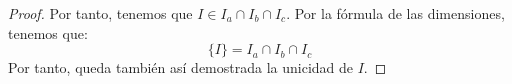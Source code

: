 \begin{proof}
    Por tanto, tenemos que $I\in I_a\cap I_b\cap I_c$. Por la fórmula de las dimensiones, tenemos que:
    \begin{equation*}
        \{I\} = I_a\cap I_b \cap I_c
    \end{equation*}
    Por tanto, queda también así demostrada la unicidad de $I$.

    \begin{comment}
    Para ello, veremos que $\vec{cI}\in \cc{L}\left\{\frac{\vec{ca}}{\left\|\vec{ca}\right\|} + \frac{\vec{cb}}{\left\|\vec{cb}\right\|}\right\}$.
    Por la igualdad triangular y como $I\in I_a$, entonces $\exists \lm_a\in \bb{R}$ tal que:
    \begin{align*}
        \vec{cI} &= \vec{ca} + \vec{aI}
                 = \vec{ca} + \lm_a \frac{\vec{ab}}{\left\|\vec{ab}\right\|} + \lm_a \frac{\vec{ac}}{\left\|\vec{ac}\right\|}
                 = \left(1-\frac{\lm_a}{\left\|\vec{ac}\right\|}\right)\vec{ca} + \frac{\lm_a}{\left\|\vec{ab}\right\|}\vec{ab} \AstIg \\
                 &\AstIg \left(1-\frac{\lm_a}{\left\|\vec{ac}\right\|}-\frac{\lm_a}{\left\|\vec{ab}\right\|}\right)\vec{ca} + \frac{\lm_a}{\left\|\vec{ab}\right\|}\vec{cb}=
    \end{align*}
    donde en $(\ast)$ he empleado que $\vec{ab}=-\vec{ca} + \vec{cb}$. Análogamente, como $I\in I_b$, entonces $\exists \lm_b\in \bb{R}$ tal que:
    \begin{align*}
        \vec{cI} &= \vec{cb} + \vec{bI}
                 = \vec{cb} + \lm_b \frac{\vec{ba}}{\left\|\vec{ba}\right\|} + \lm_b \frac{\vec{bc}}{\left\|\vec{bc}\right\|}
                 = \left(1-\frac{\lm_b}{\left\|\vec{bc}\right\|}\right)\vec{cb} + \frac{\lm_b}{\left\|\vec{ba}\right\|}\vec{ba} \AstIg \\
                 &\AstIg \left(1-\frac{\lm_b}{\left\|\vec{bc}\right\|}-\frac{\lm_b}{\left\|\vec{ba}\right\|}\right)\vec{cb} + \frac{\lm_b}{\left\|\vec{ba}\right\|}\vec{ca}=
    \end{align*}
    donde en $(\ast)$ he empleado que $\vec{ba}=-\vec{cb} + \vec{ca}$. Igualando ambas expresiones, tenemos que:
    \begin{align*}
        \left(1-\frac{\lm_a}{\left\|\vec{ac}\right\|}-\frac{\lm_a}{\left\|\vec{ab}\right\|}\right)\vec{ca} + \frac{\lm_a}{\left\|\vec{ab}\right\|}\vec{cb} &=
        \left(1-\frac{\lm_b}{\left\|\vec{bc}\right\|}-\frac{\lm_b}{\left\|\vec{ba}\right\|}\right)\vec{cb} + \frac{\lm_b}{\left\|\vec{ba}\right\|}\vec{ca} \\

\end{comment}
\end{proof}
